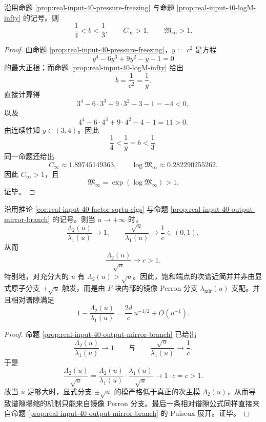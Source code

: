 \begin{corollary}[零温有限部常数的代数窗与非塌缩性]\label{cor:real-input-40-zeta-u-endpoint-finitepart-window-noncollapse}
沿用命题 \ref{prop:real-input-40-pressure-freezing} 与命题 \ref{prop:real-input-40-logM-infty} 的记号。则
\[
\frac14<b<\frac13,
\qquad
C_\infty>1,
\qquad
\mathfrak M_\infty>1.
\]
\end{corollary}
\begin{proof}
由命题 \ref{prop:real-input-40-pressure-freezing}，\(y:=c^2\) 是方程
\[
y^4-6y^3+9y^2-y-1=0
\]
的最大正根；而命题 \ref{prop:real-input-40-logM-infty} 给出
\[
b=\frac{1}{c^2}=\frac{1}{y}.
\]
直接计算得
\[
3^4-6\cdot 3^3+9\cdot 3^2-3-1=-4<0,
\]
以及
\[
4^4-6\cdot 4^3+9\cdot 4^2-4-1=11>0.
\]
由连续性知 \(y\in(3,4)\)。因此
\[
\frac14<\frac{1}{y}=b<\frac13.
\]
同一命题还给出
\[
C_\infty\approx 1.89745149363,
\qquad
\log\mathfrak M_\infty\approx 0.282290255262.
\]
因此 \(C_\infty>1\)，且
\[
\mathfrak M_\infty=\exp(\log\mathfrak M_\infty)>1.
\]
证毕。
\end{proof}

\begin{corollary}\label{cor:real-input-40-mirror-branch-dominates-gap-collapse}
沿用推论 \ref{cor:real-input-40-factor-sqrtu-eigs} 与命题 \ref{prop:real-input-40-output-mirror-branch} 的记号。则当 \(u\to+\infty\) 时，
\[
\frac{\Lambda_2(u)}{\lambda_1(u)}\to 1,
\qquad
\frac{\sqrt u}{\lambda_1(u)}\to \frac1c\in(0,1),
\]
从而
\[
\frac{\Lambda_2(u)}{\sqrt u}\to c>1.
\]
特别地，对充分大的 \(u\) 有 \(\Lambda_2(u)>\sqrt u\)。因此，饱和端点的次谱近简并并非由显式原子分支 \(\pm\sqrt u\) 触发，而是由 \(F\)-块内部的镜像 Perron 分支 \(\lambda_{\mathrm{mir}}(u)\) 支配。并且相对谱隙满足
\[
1-\frac{\Lambda_2(u)}{\lambda_1(u)}
=\frac{2d}{c}\,u^{-1/2}+O(u^{-1}).
\]
\end{corollary}
\begin{proof}
命题 \ref{prop:real-input-40-output-mirror-branch} 已给出
\[
\frac{\Lambda_2(u)}{\lambda_1(u)}\to 1
\qquad\text{与}\qquad
\frac{\sqrt u}{\lambda_1(u)}\to \frac1c.
\]
于是
\[
\frac{\Lambda_2(u)}{\sqrt u}
=
\frac{\Lambda_2(u)}{\lambda_1(u)}
\cdot
\frac{\lambda_1(u)}{\sqrt u}
\longrightarrow
1\cdot c
=c>1.
\]
故当 \(u\) 足够大时，显式分支 \(\pm\sqrt u\) 的模严格低于真正的次主模 \(\Lambda_2(u)\)，从而导致谱隙塌缩的机制只能来自镜像 Perron 分支。最后一条相对谱隙公式同样直接来自命题 \ref{prop:real-input-40-output-mirror-branch} 的 Puiseux 展开。证毕。
\end{proof}

\endinput
